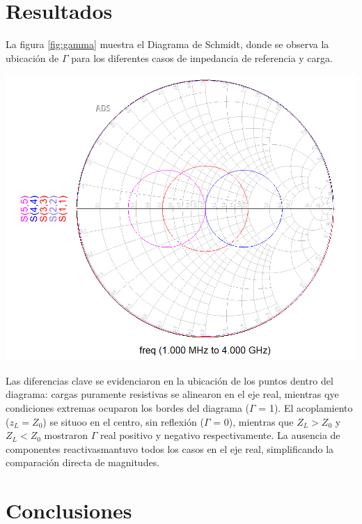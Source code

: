 \documentclass{article}   %
\theoremstyle{mytheoremstyle}
\theoremstyle{mytheoremstyle}
\theoremstyle{myproblemstyle}
\begin{document}
    \begin{minipage}{0.49\textwidth}   %
        {\centering\section*{\large Resultados}}

        La figura \ref{fig:gamma} muestra el Diagrama de Schmidt, donde se observa la ubicación de $\Gamma$ para los 
        diferentes casos de impedancia de referencia y carga.

        \includegraphics[width=\textwidth]{figures/schmidt.png}
        \label{fig:gamma}
        \vspace{0.5cm}

        Las diferencias clave se evidenciaron en la ubicación de los puntos dentro del diagrama: cargas puramente resistivas se alinearon en el eje
        real, mientras qye condiciones extremas ocuparon los bordes del diagrama ($\Gamma$ = 1). El acoplamiento ($z_{L} = Z_{0}$)
        se situoo en el centro, sin reflexión ($\Gamma$ = 0), mientras que $Z_{L} > Z_{0}$ y $Z_{L} < Z_{0}$ mostraron $\Gamma$
        real positivo y negativo respectivamente. La ausencia de componentes reactivasmantuvo todos los casos en el eje real,
        simplificando la comparación directa de magnitudes.

        {\centering\section*{\large Conclusiones}}


\end{minipage}
\end{document}
